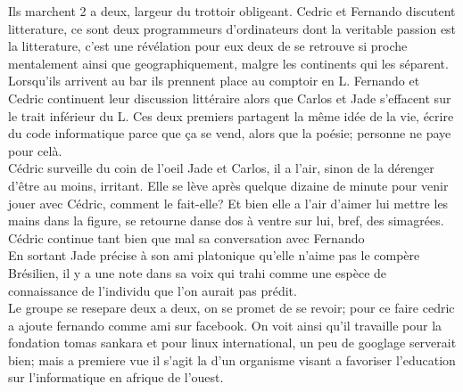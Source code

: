 \documentclass{article}
\begin{document}
Ils marchent 2 a deux, largeur du trottoir obligeant. Cedric et Fernando
discutent litterature, ce sont deux programmeurs d'ordinateurs dont la veritable
passion est la litterature, c'est une révélation pour eux deux de se retrouve si
proche mentalement ainsi que geographiquement, malgre les continents qui les
séparent.\\

Lorsqu'ils arrivent au bar ils prennent place au comptoir en L. Fernando et
Cedric continuent leur discussion littéraire alors que Carlos et Jade s'effacent
sur le trait inférieur du L. Ces deux premiers partagent la même idée de la vie,
écrire du code informatique parce que ça se vend, alors que la poésie; personne
ne paye pour celà.\\

Cédric surveille du coin de l'oeil Jade et Carlos, il a l'air, sinon de la
dérenger d'être au moins, irritant. Elle se lève après quelque dizaine de minute
pour venir jouer avec Cédric, comment le fait-elle? Et bien elle a l'air d'aimer
lui mettre les mains dans la figure, se retourne danse dos à ventre sur lui,
bref, des simagrées. Cédric continue tant bien que mal sa conversation avec
Fernando\\

En sortant Jade précise à son ami platonique qu'elle n'aime pas le
compère Brésilien, il y a une note dans sa voix qui trahi comme une
espèce de connaissance de l'individu que l'on aurait pas prédit.\\

Le groupe se resepare deux a deux, on se promet de se revoir;
pour ce faire cedric a ajoute fernando comme ami sur facebook.
On voit ainsi qu'il travaille pour la fondation tomas sankara et
pour linux international, un peu de googlage serverait bien; mais
a premiere vue il s'agit la d'un organisme visant a favoriser l'education
sur l'informatique en afrique de l'ouest.\\


\clearpage
\end{document}
